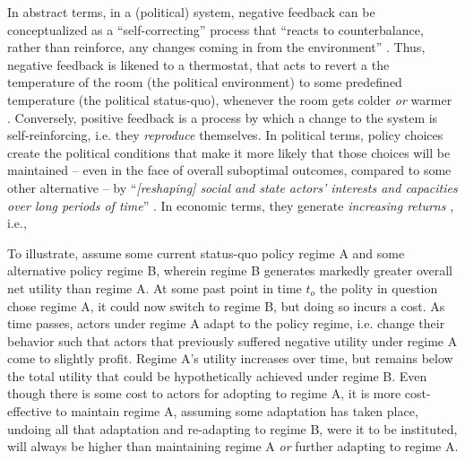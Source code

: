 \documentclass[11pt, xcolor=dvipsnames]{article}
\begin{document}
In abstract terms, in a (political) system, negative feedback can be conceptualized as a \enquote{self-correcting} \parencite[][p. 8]{Baumgartner2002} process that \enquote{reacts to counterbalance, rather than reinforce, any changes coming in from the environment} . Thus, negative feedback is likened to a thermostat, that acts to revert a the temperature of the room (the political environment) to some predefined temperature (the political status-quo), whenever the room gets colder \textit{or} warmer \parencite[][]{Wlezien1995}. Conversely, positive feedback is a process by which a change to the system is self-reinforcing, i.e. they \textit{reproduce} themselves. In political terms, policy choices create the political conditions that make it more likely that those choices will be maintained -- even in the face of overall suboptimal outcomes, compared to some other alternative -- by \enquote{\textit{[reshaping] social and state actors' interests and capacities over long periods of time}} \parencite[][p. 443, original emphasis]{Jacobs2014}. In economic terms, they generate \textit{increasing returns} \parencite[also see][]{Krasner1988}, i.e.,

To illustrate, assume some current status-quo policy regime A and some alternative policy regime B, wherein regime B generates markedly greater overall net utility than regime A. At some past point in time $t_o$ the polity in question chose regime A, it could now switch to regime B, but doing so incurs a cost. As time passes, actors under regime A adapt to the policy regime, i.e. change their behavior such that actors that previously suffered negative utility under regime A come to slightly profit. Regime A's utility increases over time, but remains below the total utility that could be hypothetically achieved under regime B. Even though there is some cost to actors for adopting to regime A, it is more cost-effective to maintain regime A, assuming some adaptation has taken place, undoing all that adaptation and re-adapting to regime B, were it to be instituted, will always be higher than maintaining regime A \textit{or} further adapting to regime A. 
\end{document}
